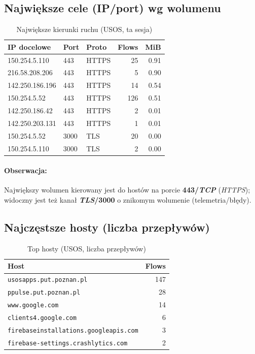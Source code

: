 \subsection{Największe cele (IP/port) wg wolumenu}
\begin{table}[H]
  \centering
  \caption{Największe kierunki ruchu (USOS, ta sesja)}
  \label{tab:usos-topdst}
  \begin{tabular}{lllrr}
    \toprule
    \textbf{IP docelowe} & \textbf{Port} & \textbf{Proto} & \textbf{Flows} & \textbf{MiB} \\
    \midrule
    150.254.5.110   & 443  & HTTPS & 25  & 0.91 \\
    216.58.208.206  & 443  & HTTPS & 5   & 0.90 \\
    142.250.186.196 & 443  & HTTPS & 14  & 0.54 \\
    150.254.5.52    & 443  & HTTPS & 126 & 0.51 \\
    142.250.186.42  & 443  & HTTPS & 2   & 0.01 \\
    142.250.203.131 & 443  & HTTPS & 1   & 0.01 \\
    150.254.5.52    & 3000 & TLS   & 20  & 0.00 \\
    150.254.5.110   & 3000 & TLS   & 2   & 0.00 \\
    \bottomrule
  \end{tabular}
\end{table}

\paragraph{Obserwacja:}
Największy wolumen kierowany jest do hostów na porcie \textbf{443/\emph{TCP}} (\emph{HTTPS}); widoczny jest też kanał \textbf{\emph{TLS}/3000} o znikomym wolumenie (telemetria/błędy).

\subsection{Najczęstsze hosty (liczba przepływów)}
\begin{table}[H]
  \centering
  \caption{Top hosty (USOS, liczba przepływów)}
  \label{tab:usos-hosts}
  \begin{tabular}{lr}
    \toprule
    \textbf{Host} & \textbf{Flows} \\
    \midrule
    \texttt{usosapps.put.poznan.pl} & 147 \\
    \texttt{ppulse.put.poznan.pl} & 28 \\
    \texttt{www.google.com} & 14 \\
    \texttt{clients4.google.com} & 6 \\
    \texttt{firebaseinstallations.googleapis.com} & 3 \\
    \texttt{firebase-settings.crashlytics.com} & 2 \\
    \bottomrule
  \end{tabular}
\end{table}

